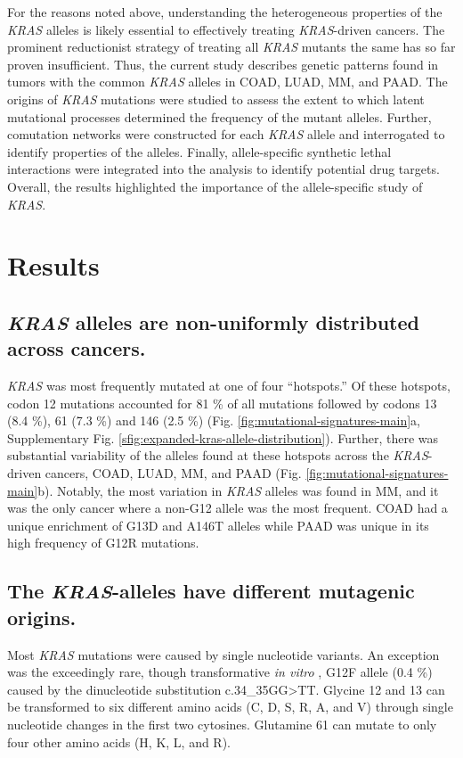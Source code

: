 \documentclass[english, 12pt, letterpaper]{article}
\newcommand{\KRAS}{\emph{KRAS}}
\begin{document}
For the reasons noted above, understanding the heterogeneous properties of the \KRAS{} alleles is likely essential to effectively treating \KRAS{}-driven cancers.
The prominent reductionist strategy of treating all \KRAS{} mutants the same has so far proven insufficient.
Thus, the current study describes genetic patterns found in tumors with the common \KRAS{} alleles in COAD, LUAD, MM, and PAAD.
The origins of \KRAS{} mutations were studied to assess the extent to which latent mutational processes determined the frequency of the mutant alleles.
Further, comutation networks were constructed for each \KRAS{} allele and interrogated to identify properties of the alleles.
Finally, allele-specific synthetic lethal interactions were integrated into the analysis to identify potential drug targets.
Overall, the results highlighted the importance of the allele-specific study of \KRAS{}.

\section*{Results}

\subsection*{\KRAS{} alleles are non-uniformly distributed across cancers.}


\KRAS{} was most frequently mutated at one of four “hotspots.” 
Of these hotspots, codon 12 mutations accounted for 81 \% of all mutations followed by codons 13 (8.4 \%), 61 (7.3 \%) and 146 (2.5 \%) (Fig. \ref{fig:mutational-signatures-main}a, Supplementary Fig. \ref{sfig:expanded-kras-allele-distribution}). 
Further, there was substantial variability of the alleles found at these hotspots across the \KRAS{}-driven cancers, COAD, LUAD, MM, and PAAD (Fig. \ref{fig:mutational-signatures-main}b). 
Notably, the most variation in \KRAS{} alleles was found in MM, and it was the only cancer where a non-G12 allele was the most frequent. 
COAD had a unique enrichment of G13D and A146T alleles while PAAD was unique in its high frequency of G12R mutations.


\subsection*{The \KRAS{}-alleles have different mutagenic origins.}

Most \KRAS{} mutations were caused by single nucleotide variants.
An exception was the exceedingly rare, though transformative \emph{in vitro} \cite{Barbacid1987}, G12F allele (0.4 \%) caused by the dinucleotide substitution c.34\_35GG>TT. Glycine 12 and 13 can be transformed to six different amino acids (C, D, S, R, A, and V) through single nucleotide changes in the first two cytosines.
Glutamine 61 can mutate to only four other amino acids (H, K, L, and R).
\end{document}
